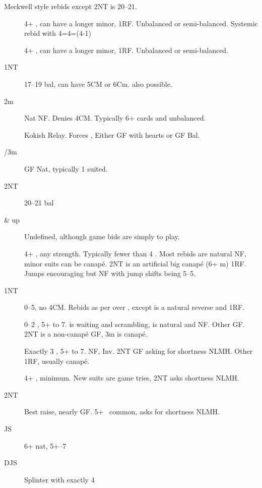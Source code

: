 \documentclass[tom-ari]{subfile}
\begin{document}
	
	Meckwell style rebids except 2NT is 20--21.
	
	\begin{description}
		\item[] 4+ \heartsuit, can have a longer minor, 1RF.  Unbalanced or semi-balanced. Systemic rebid with 4=4=(4-1)
		\item[] 4+ \spadesuit, can have a longer minor, 1RF.  Unbalanced or semi-balanced.
		\item[1NT] 17--19 bal, can have 5CM or 6Cm.   also possible.
		\item[2m] Nat NF.  Denies 4CM.  Typically 6+ cards and unbalanced.
		\item[] Kokish Relay.  Forces , Either GF with hearts or GF Bal.
		\item[/3m] GF Nat, typically 1 suited.
		\item[2NT] 20--21 bal
		\item[ \& up] Undefined, although game bids are simply to play.

	\end{description}

	
	\begin{description}
		\item[] 4+ \spadesuit, any strength.  Typically fewer than 4 \heartsuit.  Most rebids are natural NF, minor suits can be canap\'e. 2NT is an artificial big canap\'e (6+ m) 1RF.  Jumps encouraging but NF with jump shifts being 5--5. 
		\item[1NT] 0--5, no 4CM.  Rebids as per over , except  is a natural reverse and 1RF.
		\item[] 0--2 \heartsuit, 5+ to 7.   is waiting and scrambling,  is natural and NF. Other GF.  2NT is a non-canap\'e GF, 3m is canap\'e.
		\item[] Exactly 3 \heartsuit, 5+ to 7.  NF,  Inv.  2NT GF asking for shortness NLMH. Other 1RF, usually canap\'e.
		\item[] 4+ \heartsuit, minimum. New suits are game tries, 2NT asks shortness NLMH.
		\item[2NT] Best raise, nearly GF.  5+ \heartsuit ~common,  asks for shortness NLMH.
		\item[JS] 6+ nat, 5+--7
		\item[DJS] Splinter with exactly 4\heartsuit		
	\end{description}
	
\end{document}
